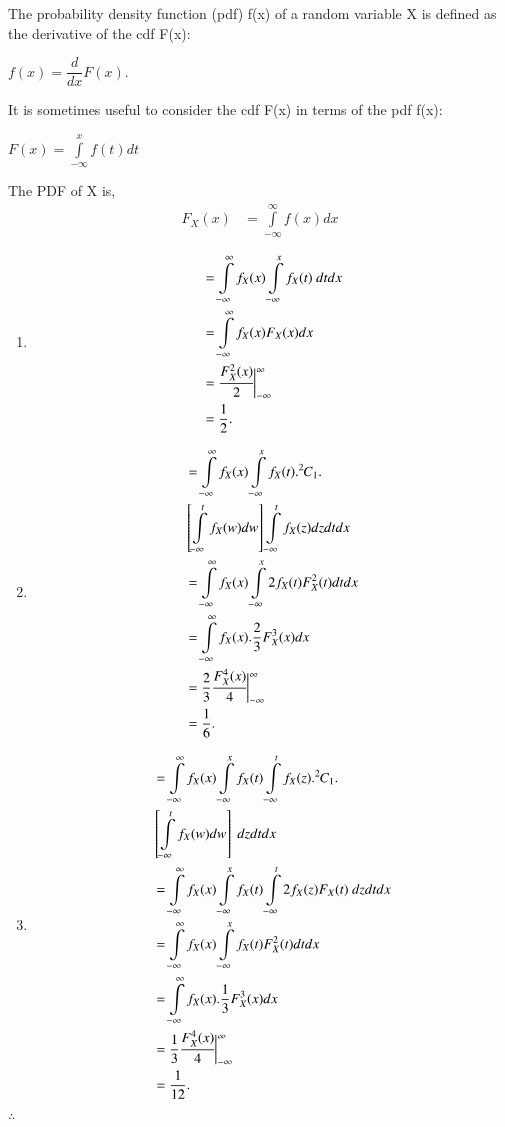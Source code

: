 The probability density function (pdf) f(x) of a random variable X is defined as the derivative of the cdf F(x): \\
\begin{center}
\begin{math}
    f(x) = \dfrac{d}{d x}F(x).
\end{math}
\end{center} 
It is sometimes useful to consider the cdf F(x) in terms of the pdf f(x):
\begin{center}
    \begin{math}
    F(x) = \int\limits_{-\infty}^x f(t) d t
    \end{math}
\end{center}
The PDF of X is,
\begin{align}
    F_X(x) &= \int\limits_{-\infty}^\infty f(x) d x 
\end{align}
\begin{enumerate}
    \item {}
\begin{align}
&= \int\limits_{-\infty}^\infty f_X(x) \int\limits_{-\infty}^x                    f_X(t)\ d t d x \\
&= \int\limits_{-\infty}^\infty f_X(x) F_X(x) d x \\
&= \cfrac{F^{2}_X(x)}{2} \biggr \vert_{-\infty}^{\infty} \\
&= \dfrac{1}{2}.
\end{align}
    \item {} 
\begin{align}
&= \nonumber \int\limits_{-\infty}^\infty f_X(x) \int\limits_{-\infty}^x f_X(t).{{}^{2}\mkern-1muC_{1}}. \\ 
&  {}\left[\int\limits_{-\infty}^t f_X(w) d w\right] 
   \int\limits_{-\infty}^t f_X(z) d z d t d x \\  
&= \int\limits_{-\infty}^\infty f_X(x) \int\limits_{-\infty}^x 2f_X(t)F^{2}_X(t) d t d x\\
&= \int\limits_{-\infty}^\infty f_X(x). \dfrac{2}{3} F^{3}_X(x) d x \\
&= \dfrac{2}{3}\cfrac{F^{4}_X(x)}{4} \biggr \vert_{-\infty}^{\infty} \\    
&= \dfrac{1}{6}.   
\end{align}
    \item {} 
\begin{align}
&= \nonumber \int\limits_{-\infty}^\infty f_X(x) \int\limits_{-\infty}^x f_X(t) 
\int\limits_{-\infty}^t f_X(z). {{}^{2}\mkern-1muC_{1}}. \\
&  {}\left[\int\limits_{-\infty}^t f_X(w) d w\right]\ d z d t d x \\
&= \int\limits_{-\infty}^\infty f_X(x) \int\limits_{-\infty}^x f_X(t) \int\limits_{-\infty}^t 2f_X(z)F_X(t)\ d z d t d x \\
&= \int\limits_{-\infty}^\infty f_X(x) \int\limits_{-\infty}^x f_X(t)F^{2}_X(t) d t d x \\
&= \int\limits_{-\infty}^\infty f_X(x).\dfrac{1}{3}F^{3}_X(x) d x \\
&= \dfrac{1}{3}\cfrac{F^{4}_X(x)}{4} \biggr \vert_{-\infty}^{\infty} \\
&= \dfrac{1}{12}.   
\end{align}
\end{enumerate}
\begin{center}
  $\therefore$ 
\end{center}